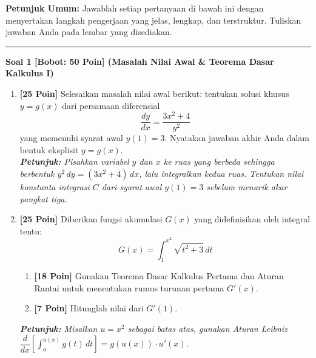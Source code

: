 \documentclass[11pt,a4paper]{article}
\begin{document}
\vspace{6pt}
\noindent\textbf{Petunjuk Umum:} Jawablah setiap pertanyaan di bawah ini dengan menyertakan langkah pengerjaan yang jelas, lengkap, dan terstruktur. Tuliskan jawaban Anda pada lembar yang disediakan.

\vspace{6pt}
\hrule
\vspace{10pt}

\noindent\textbf{Soal 1 [Bobot: 50 Poin] (Masalah Nilai Awal \& Teorema Dasar Kalkulus I)}
\begin{enumerate}[label=(\alph*), leftmargin=22pt]
    \item \textbf{[25 Poin]} Selesaikan masalah nilai awal berikut: tentukan solusi khusus $y = g(x)$ dari persamaan diferensial
    \[
    \frac{dy}{dx} = \frac{3x^2 + 4}{y^2}
    \]
    yang memenuhi syarat awal $y(1) = 3$. Nyatakan jawaban akhir Anda dalam bentuk eksplisit $y = g(x)$.\\
    \textit{\small\textbf{Petunjuk:} Pisahkan variabel $y$ dan $x$ ke ruas yang berbeda sehingga berbentuk $y^2\,dy = (3x^2 + 4)\,dx$, lalu integralkan kedua ruas. Tentukan nilai konstanta integrasi $C$ dari syarat awal $y(1) = 3$ sebelum menarik akar pangkat tiga.}
    
    \vspace{8pt}
    \item \textbf{[25 Poin]} Diberikan fungsi akumulasi $G(x)$ yang didefinisikan oleh integral tentu:
    \[
    G(x) = \int_{1}^{x^2} \sqrt{t^2 + 3}\,dt
    \]
    \begin{enumerate}[label=(\roman*)]
        \item \textbf{[18 Poin]} Gunakan Teorema Dasar Kalkulus Pertama dan Aturan Rantai untuk menentukan rumus turunan pertama $G'(x)$.
        \item \textbf{[7 Poin]} Hitunglah nilai dari $G'(1)$.
    \end{enumerate}
    \textit{\small\textbf{Petunjuk:} Misalkan $u = x^2$ sebagai batas atas, gunakan Aturan Leibniz $\dfrac{d}{dx}\left[\int_a^{u(x)} g(t)\,dt\right] = g(u(x))\cdot u'(x)$.}
\end{enumerate}

\vspace{14pt}
\end{document}
